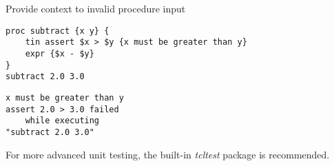 \documentclass{article}
\begin{document}
\begin{example}{Provide context to invalid procedure input}
\begin{lstlisting}
proc subtract {x y} {
    tin assert $x > $y {x must be greater than y}
    expr {$x - $y}
}
subtract 2.0 3.0
\end{lstlisting} 
\tcblower
\begin{lstlisting}
x must be greater than y
assert 2.0 > 3.0 failed
    while executing
"subtract 2.0 3.0"
\end{lstlisting}
\end{example}
For more advanced unit testing, the built-in \textit{tcltest} package is recommended.
\clearpage
\printindex
\end{document}
